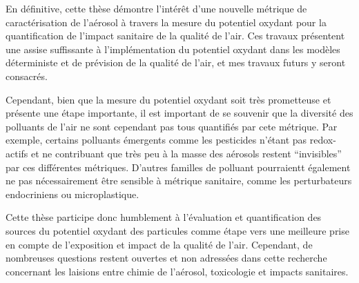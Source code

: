 En définitive, cette thèse démontre l'intérêt d'une nouvelle métrique de caractérisation
de l'aérosol à travers la mesure du potentiel oxydant pour la quantification de l'impact
sanitaire de la qualité de l'air. 
Ces travaux présentent une assise suffissante à l'implémentation du
potentiel oxydant dans les modèles déterministe et de prévision de la qualité de l'air, et
mes travaux futurs y seront consacrés.

Cependant, bien que la mesure du potentiel oxydant soit très prometteuse et présente une
étape importante, il est important de se souvenir que la diversité des polluants de l'air
ne sont cependant pas tous quantifiés par cete métrique.  Par exemple, certains polluants
émergents comme les pesticides n'étant pas redox-actifs et ne contribuant que très peu à
la masse des aérosols restent ``invisibles'' par ces différentes métriques. D'autres
familles de polluant pourraientt également ne pas nécessairement être sensible à métrique
sanitaire, comme les perturbateurs endocriniens ou microplastique.

Cette thèse participe donc humblement à l'évaluation et quantification des sources
du potentiel oxydant des particules comme étape vers une meilleure prise en compte de
l'exposition et impact de la qualité de l'air. Cependant, de nombreuses questions restent
ouvertes et non adressées dans cette recherche concernant les laisions entre chimie de
l'aérosol, toxicologie et impacts sanitaires.
